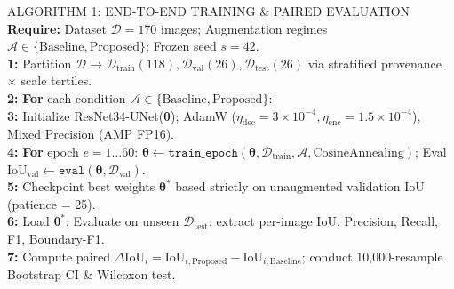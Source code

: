\documentclass[10pt]{article}
\begin{document}
\begin{minipage}[t]{0.435\textwidth}
    \begin{bwcard}{ALGORITHM 1: END-TO-END TRAINING \& PAIRED EVALUATION}
    {\fontsize{6.8}{8.2}\selectfont
    \textbf{Require:} Dataset $\mathcal{D} = 170$ images; Augmentation regimes $\mathcal{A} \in \{\text{Baseline}, \text{Proposed}\}$; Frozen seed $s = 42$.\\
    \textbf{1:} Partition $\mathcal{D} \to \mathcal{D}_{\text{train}} (118), \mathcal{D}_{\text{val}} (26), \mathcal{D}_{\text{test}} (26)$ via stratified provenance $\times$ scale tertiles.\\
    \textbf{2:} \textbf{For} each condition $\mathcal{A} \in \{\text{Baseline}, \text{Proposed}\}$:\\
    \textbf{3:} \quad Initialize ResNet34-UNet($\bm{\theta}$); AdamW ($\eta_{\text{dec}} = 3\times 10^{-4}, \eta_{\text{enc}} = 1.5\times 10^{-4}$), Mixed Precision (AMP FP16).\\
    \textbf{4:} \quad \textbf{For} epoch $e = 1 \dots 60$: $\bm{\theta} \gets \mathtt{train\_epoch}(\bm{\theta}, \mathcal{D}_{\text{train}}, \mathcal{A}, \text{CosineAnnealing})$; Eval $\text{IoU}_{\text{val}} \gets \mathtt{eval}(\bm{\theta}, \mathcal{D}_{\text{val}})$.\\
    \textbf{5:} \quad Checkpoint best weights $\bm{\theta}^*$ based strictly on unaugmented validation IoU (patience = 25).\\
    \textbf{6:} \quad Load $\bm{\theta}^*$; Evaluate on unseen $\mathcal{D}_{\text{test}}$: extract per-image IoU, Precision, Recall, F1, Boundary-F1.\\
    \textbf{7:} Compute paired $\Delta \text{IoU}_i = \text{IoU}_{i, \text{Proposed}} - \text{IoU}_{i, \text{Baseline}}$; conduct 10,000-resample Bootstrap CI \& Wilcoxon test.
    }
    \end{bwcard}
\end{minipage}%
\hfill
\end{document}
